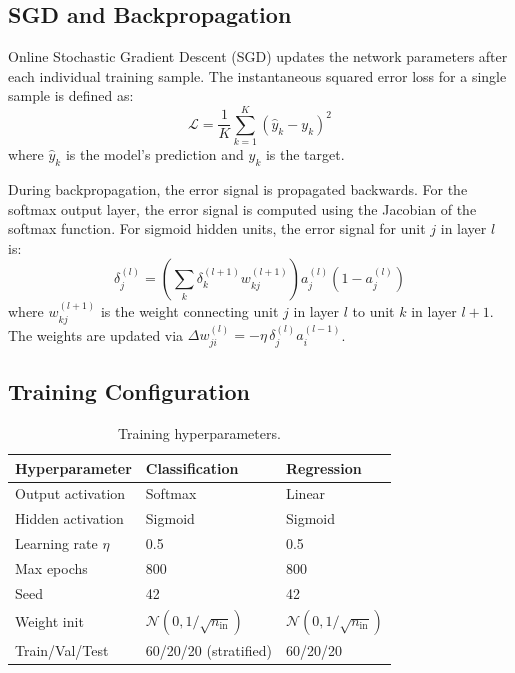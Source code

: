 \documentclass[11pt,a4paper]{article}
\begin{document}
\subsection{SGD and Backpropagation}
Online Stochastic Gradient Descent (SGD) updates the network parameters after each individual training sample. The instantaneous squared error loss for a single sample is defined as:
\begin{equation}
\mathcal{L} = \frac{1}{K}\sum_{k=1}^{K}(\hat{y}_k - y_k)^2
\end{equation}
where $\hat{y}_k$ is the model's prediction and $y_k$ is the target.

During backpropagation, the error signal is propagated backwards. For the softmax output layer, the error signal is computed using the Jacobian of the softmax function. For sigmoid hidden units, the error signal for unit $j$ in layer $l$ is:
\begin{equation}
\delta^{(l)}_j = \left(\sum_k \delta^{(l+1)}_k w^{(l+1)}_{kj}\right) a^{(l)}_j (1 - a^{(l)}_j)
\end{equation}
where $w^{(l+1)}_{kj}$ is the weight connecting unit $j$ in layer $l$ to unit $k$ in layer $l+1$. The weights are updated via $\Delta w^{(l)}_{ji} = -\eta \, \delta^{(l)}_j a^{(l-1)}_i$.

\subsection{Training Configuration}
\begin{table}[H]
\centering
\caption{Training hyperparameters.}
\begin{tabular}{lll}
\toprule
Hyperparameter & Classification & Regression \\
\midrule
Output activation & Softmax & Linear \\
Hidden activation & Sigmoid & Sigmoid \\
Learning rate $\eta$ & 0.5 & 0.5 \\
Max epochs & 800 & 800 \\
Seed & 42 & 42 \\
Weight init & $\mathcal{N}(0,1/\sqrt{n_{\text{in}}})$ & $\mathcal{N}(0,1/\sqrt{n_{\text{in}}})$ \\
Train/Val/Test & 60/20/20 (stratified) & 60/20/20 \\
\bottomrule
\end{tabular}
\end{table}

\end{document}
